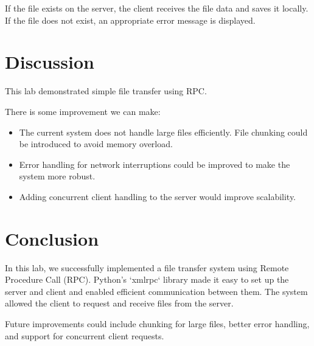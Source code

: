 \documentclass[a4paper,12pt]{article}
\begin{document}
If the file exists on the server, the client receives the file data and saves it locally. If the file does not exist, an appropriate error message is displayed.

\section{Discussion}
This lab demonstrated simple file transfer using RPC.

There is some improvement we can make:
\begin{itemize}
    \item The current system does not handle large files efficiently. File chunking could be introduced to avoid memory overload.
    \item Error handling for network interruptions could be improved to make the system more robust.
    \item Adding concurrent client handling to the server would improve scalability.
\end{itemize}

\section{Conclusion}
In this lab, we successfully implemented a file transfer system using Remote Procedure Call (RPC). Python's `xmlrpc` library made it easy to set up the server and client and enabled efficient communication between them. The system allowed the client to request and receive files from the server.

Future improvements could include chunking for large files, better error handling, and support for concurrent client requests.
\end{document}
